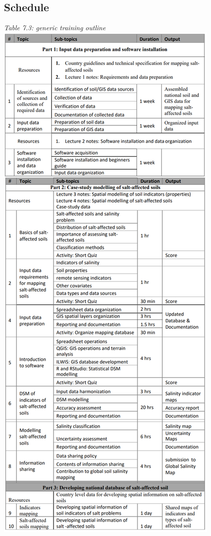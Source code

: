 \documentclass[
  10pt,
  b5paper,
]{book}
\begin{document}
\hypertarget{schedule}{%
\subsection{Schedule}\label{schedule}}

\emph{Table 7.3: generic training outline}
\includegraphics{figures/tables/Table_7.2.png}
\end{document}
